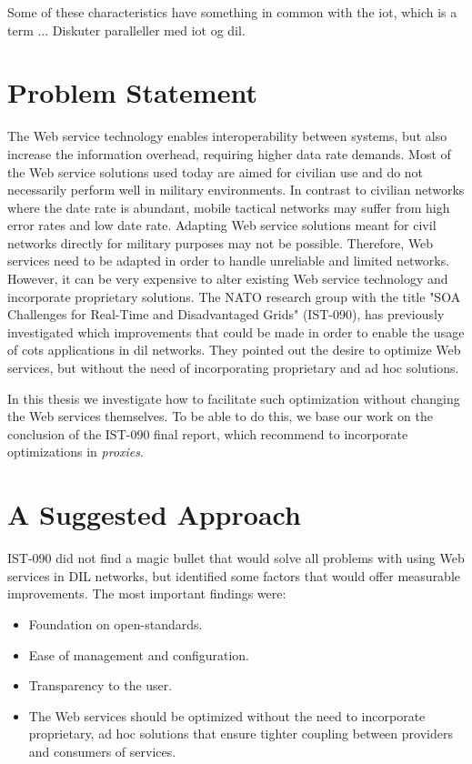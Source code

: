 Some of these characteristics have something in common with the \gls{iot}, which is a term ...
Diskuter paralleller med iot og dil.



\section{Problem Statement}
\label{section:problem-statement}

The Web service technology enables interoperability between systems, but also
increase the information overhead, requiring higher data rate demands. Most of
the Web service solutions used today are aimed for civilian use and do not
necessarily perform well in military environments. In contrast to civilian
networks where the date rate is abundant, mobile tactical networks may suffer
from high error rates and low date rate. Adapting Web service solutions meant
for civil networks directly for military purposes may not be possible.
Therefore, Web services need to be adapted in order to handle unreliable and
limited networks. However, it can be very expensive to alter existing Web
service technology and incorporate proprietary solutions. The NATO research
group with the title "SOA Challenges for Real-Time and Disadvantaged Grids"
(IST-090), has previously investigated which improvements that could be made in
order to enable the usage of \gls{cots} applications in \gls{dil} networks. They
pointed out the desire to optimize Web services, but without the need of
incorporating proprietary and ad hoc solutions.

In this thesis we investigate how to facilitate such optimization without
changing the Web services themselves. To be able to do this, we base our work on
the conclusion of the IST-090 final report\cite{ist-090}, which recommend to
incorporate optimizations in \textit{proxies}.

\section{A Suggested Approach}
\label{section:hypothesis}

IST-090 did not find a magic bullet that would solve all problems with using Web
services in DIL networks, but identified some factors that would offer measurable
improvements. The most important findings were:

\begin{itemize}

    \item Foundation on open-standards.

    \item Ease of management and configuration.

    \item Transparency to the user.

    \item The Web services should be optimized without the need to incorporate
    proprietary, ad hoc solutions that ensure tighter coupling between providers
    and consumers of services.

\end{itemize}

